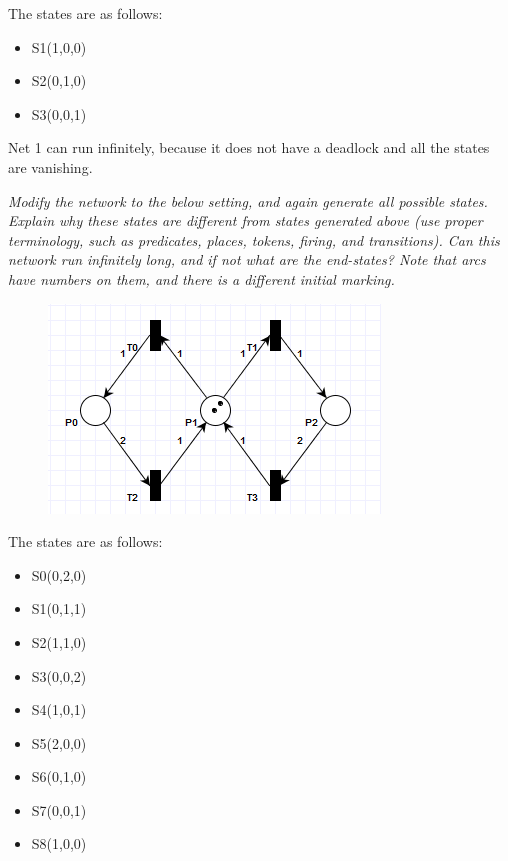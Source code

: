 \documentclass[letterpaper]{article}
\begin{document}
The states are as follows:
\begin{itemize}
 \item S1(1,0,0)
 \item S2(0,1,0)
 \item S3(0,0,1)
\end{itemize}

Net 1 can run infinitely, because it does not have a deadlock and all the states
are vanishing.

\textit{Modify the network to the below setting, and again generate all possible states. Explain why these states are different from states generated above (use proper terminology, such as predicates, places, tokens, firing, and transitions). Can this network run infinitely long, and if not what are the end-states?
 Note that arcs have numbers on them, and there is a different initial marking.
}

\begin{figure}[H]
 \centering
 \includegraphics[width=\textwidth]{image2.png}
\end{figure}

The states are as follows:
\begin{itemize}
 \item S0(0,2,0)
 \item S1(0,1,1)
 \item S2(1,1,0)
 \item S3(0,0,2)
 \item S4(1,0,1)
 \item S5(2,0,0)
 \item S6(0,1,0)
 \item S7(0,0,1)
 \item S8(1,0,0)
\end{itemize}
\end{document}
